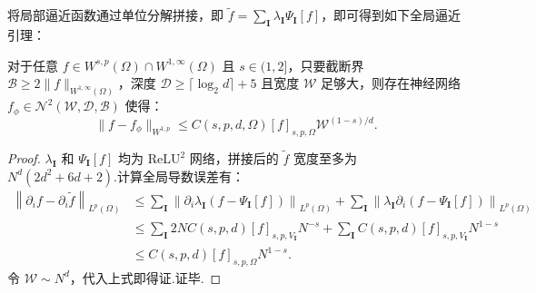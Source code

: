 将局部逼近函数通过单位分解拼接，即 $\tilde{f}=\sum_{\mathbf{I}}\lambda_{\mathbf{I}}\Psi_{\mathbf{I}}[f]$，即可得到如下全局逼近引理：
\begin{lemma}[全局逼近]\label{lemma:totalapp}
对于任意 $f\in W^{s,p}(\Omega)\cap W^{1,\infty}(\Omega)$ 且 $s\in (1,2]$，只要截断界 $\mathcal{B}\geq 2\|f\|_{W^{1,\infty}(\Omega)}$，深度 $\mathcal{D}\geq \lceil \log_{2}d\rceil +5$ 且宽度 $\mathcal{W}$ 足够大，则存在神经网络 $f_{\phi}\in \mathcal{N}^{2}(\mathcal{W},\mathcal{D},\mathcal{B})$ 使得：
\begin{equation*}
\|f-f_{\phi}\|_{W^{1,p}}\leq C(s,p,d,\Omega)[f]_{s,p,\Omega}\mathcal{W}^{(1-s)/d}.
\end{equation*}
\end{lemma}
\begin{proof}
$\lambda_{\mathbf{I}}$ 和 $\Psi_{\mathbf{I}}[f]$ 均为 $\mathrm{ReLU}^{2}$ 网络，拼接后的 $\tilde{f}$ 宽度至多为 $N^{d}\left(2d^{2}+6d+2\right)$.计算全局导数误差有：
\begin{equation*}
\begin{aligned}
\left\|\partial_{i}f-\partial_{i}\tilde{f} \right\|_{L^{p}(\Omega)} &\leq \sum\limits_{\mathbf{I}}\left\|\partial_{i}\lambda_{\mathbf{I}}\left(f-\Psi_{\mathbf{I}}[f]\right)\right\|_{L^{p}(\Omega)}+\sum\limits_{\mathbf{I}}\left\|\lambda_{\mathbf{I}}\partial_{i}\left(f-\Psi_{\mathbf{I}}[f]\right)\right\|_{L^{p}(\Omega)}\\
&\leq \sum\limits_{\mathbf{I}}2NC(s,p,d)[f]_{s,p,V_{\mathbf{I}}}N^{-s}+\sum\limits_{\mathbf{I}}C(s,p,d)[f]_{s,p,V_{\mathbf{I}}}N^{1-s}\\
&\leq C(s,p,d)[f]_{s,p,\Omega}N^{1-s}.
\end{aligned}
\end{equation*}
令 $\mathcal{W} \sim N^d$，代入上式即得证.证毕.
\end{proof}



